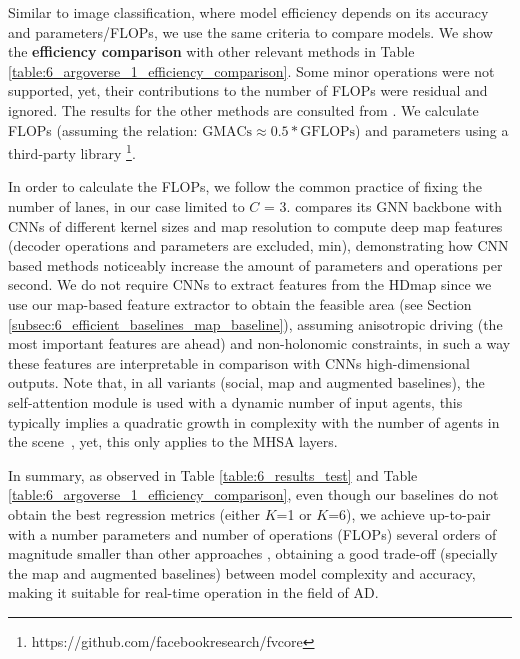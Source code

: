 Similar to image classification, where model efficiency depends on its accuracy and parameters/\acp{FLOP}, we use the same criteria to compare models. We show the \textbf{efficiency comparison} with other relevant methods in Table \ref{table:6_argoverse_1_efficiency_comparison}. Some minor operations were not supported, yet, their contributions to the number of \acp{FLOP} were residual and ignored. The results for the other methods are consulted from \cite{gilles2021home} \cite{gilles2022gohome} \cite{gao2020vectornet} \cite{he2022multi}. We calculate \acp{FLOP} (assuming the relation: $\text{GMACs} \approx 0.5 * \text{GFLOPs}$) and parameters using a third-party library \footnote{https://github.com/facebookresearch/fvcore}.

In order to calculate the FLOPs, we follow the common practice \cite{gao2020vectornet} \cite{gu2021densetnt} \cite{gilles2022gohome} of fixing the number of lanes, in our case limited to $C$ = 3. %
%
\cite{gao2020vectornet} compares its \ac{GNN} backbone with \acp{CNN} of different kernel sizes and map resolution to compute deep map features (decoder operations and parameters are excluded, min), demonstrating how \ac{CNN} based methods noticeably increase the amount of parameters and operations per second. We do not require \acp{CNN} to extract features from the \ac{HDmap} since we use our map-based feature extractor to obtain the feasible area (see Section \ref{subsec:6_efficient_baselines_map_baseline}), assuming anisotropic driving (the most important features are ahead) and non-holonomic constraints, in such a way these features are interpretable in comparison with \acp{CNN} high-dimensional outputs. Note that, in all variants (social, map and augmented baselines), the self-attention module is used with a dynamic number of input agents, this typically implies a quadratic growth in complexity with the number of agents in the scene~\cite{vaswani2017attention}, yet, this only applies to the \ac{MHSA} layers.

In summary, as observed in Table \ref{table:6_results_test} and Table \ref{table:6_argoverse_1_efficiency_comparison}, even though our baselines do not obtain the best regression metrics (either $K$=1 or $K$=6), we achieve up-to-pair with a number parameters and number of operations (\acp{FLOP}) several orders of magnitude smaller than other approaches \cite{gu2021densetnt} \cite{liang2020learning}, obtaining a good trade-off (specially the map and augmented baselines) between model complexity and accuracy, making it suitable for real-time operation in the field of \ac{AD}. 

